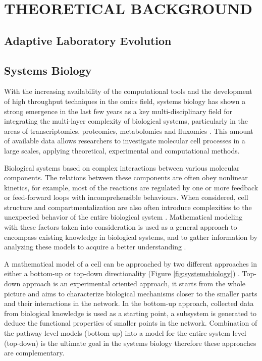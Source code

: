 \chapter{THEORETICAL BACKGROUND}

\section{Adaptive Laboratory Evolution}


\section{Systems Biology}
With the increasing availability of the computational tools and the development of high throughput techniques in the omics field, systems biology has shown a strong emergence in the last few years as a key multi-disciplinary field for integrating the multi-layer complexity of biological systems, particularly in the areas of transcriptomics, proteomics, metabolomics and fluxomics \cite{kitano2002systems}. This amount of available data allows researchers to investigate molecular cell processes in a large scales, applying theoretical, experimental and computational methods.

Biological systems based on complex interactions between various molecular components. The relations between these components are often obey nonlinear kinetics, for example, most of the reactions are regulated by one or more feedback or feed-forward loops with incomprehensible behaviours. When considered, cell structure and compartmentalization are also often introduce complexities to the unexpected behavior of the entire biological system \cite{bellouquid2006mathematical}. Mathematical modeling with these factors taken into consideration is used as a general approach to encompass existing knowledge in biological systems, and to gather information by analyzing these models to acquire a better understanding \cite{kremling2013systems}.

A mathematical model of a cell can be approached by two different approaches in either a bottom-up or top-down directionality (Figure \ref{fig:systemsbiology}) \cite{bruggeman2007nature, shahzad2012application}. Top-down approach is an experimental oriented approach, it starts from the whole picture and aims to characterize biological mechanisms closer to the smaller parts and their interactions in the network. In the bottom-up approach, collected data from biological knowledge is used as a starting point, a subsystem is generated to deduce the functional properties of smaller points in the network. Combination of the pathway level models (bottom-up) into a model for the entire system level (top-down) is the ultimate goal in the systems biology therefore these approaches are complementary.

